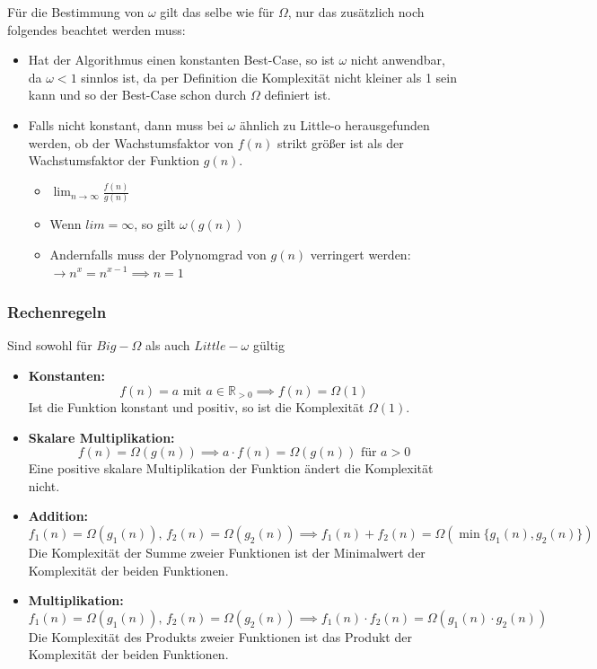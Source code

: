 \documentclass[
../../AuD-Zusammenfassung.tex,
]
{subfiles}
\begin{document}
Für die Bestimmung von $\omega$ gilt das selbe wie für $\Omega$, nur das zusätzlich noch folgendes beachtet werden muss: 
\begin{itemize}
    \item Hat der Algorithmus einen konstanten Best-Case, so ist $\omega$ nicht anwendbar, da $\omega < 1$ sinnlos ist, da per Definition die Komplexität nicht kleiner als 1 sein kann und so der Best-Case schon durch $\Omega$ definiert ist. 
    \item Falls nicht konstant, dann muss bei $\omega$ ähnlich zu Little-o herausgefunden werden, ob der Wachstumsfaktor von $f(n)$ strikt größer ist als der Wachstumsfaktor der Funktion $g(n)$.
    \begin{itemize}
        \item $\lim_{n \to \infty}\frac{f(n)}{g(n)}$
        \item Wenn $lim = \infty$, so gilt $\omega(g(n))$
        \item Andernfalls muss der Polynomgrad von $g(n)$ verringert werden:\\
        $\longrightarrow n^x = n^{x - 1} \implies n = 1$
    \end{itemize}
\end{itemize}

\subsubsection{Rechenregeln}
Sind sowohl für $Big-\Omega$ als auch $Little-\omega$ gültig

\begin{itemize}
    \item \textbf{Konstanten:} \\
    \[
    f(n) = a \text{ mit } a \in \mathbb{R}_{>0} \implies f(n) = \Omega(1)
    \]
    Ist die Funktion konstant und positiv, so ist die Komplexität \(\Omega(1)\).

    \item \textbf{Skalare Multiplikation:} \\
    \[
    f(n) = \Omega(g(n)) \implies a \cdot f(n) = \Omega(g(n)) \text{ für } a > 0
    \]
    Eine positive skalare Multiplikation der Funktion ändert die Komplexität nicht.

    \item \textbf{Addition:} \\
    \[
    f_1(n) = \Omega(g_1(n)), \, f_2(n) = \Omega(g_2(n)) \implies f_1(n) + f_2(n) = \Omega(\min\{g_1(n), g_2(n)\})
    \]
    Die Komplexität der Summe zweier Funktionen ist der Minimalwert der Komplexität der beiden Funktionen.

    \item \textbf{Multiplikation:} \\
    \[
    f_1(n) = \Omega(g_1(n)), \, f_2(n) = \Omega(g_2(n)) \implies f_1(n) \cdot f_2(n) = \Omega(g_1(n) \cdot g_2(n))
    \]
    Die Komplexität des Produkts zweier Funktionen ist das Produkt der Komplexität der beiden Funktionen.
\end{itemize}
\end{document}
